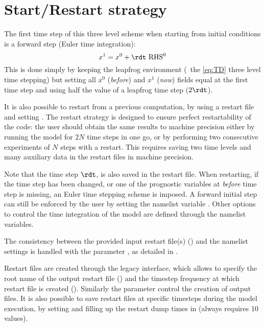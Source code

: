 \documentclass[../main/NEMO_manual]{subfiles}
\begin{document}
\section{Start/Restart strategy}
\label{sec:TD_rst}

\begin{listing}
  \caption{}
  \label{lst:namrun}
\end{listing}

The first time step of this three level scheme when starting from initial conditions is
a forward step (Euler time integration):
\[
  x^1 = x^0 + \rdt \ \text{RHS}^0
\]
This is done simply by keeping the leapfrog environment
(\ie\ the \autoref{eq:TD} three level time stepping) but
setting all $x^0$ (\textit{before}) and $x^1$ (\textit{now}) fields equal at the first time step and
using half the value of a leapfrog time step ($2 \rdt$).

It is also possible to restart from a previous computation, by using a restart file and setting .
The restart strategy is designed to ensure perfect restartability of the code:
the user should obtain the same results to machine precision either by
running the model for $2N$ time steps in one go,
or by performing two consecutive experiments of $N$ steps with a restart.
This requires saving two time levels and many auxiliary data in
the restart files in machine precision.

Note that the time step $\rdt$, is also saved in the restart file.
When restarting, if the time step has been changed, or
one of the prognostic variables at \textit{before} time step is missing,
an Euler time stepping scheme is imposed.
A forward initial step can still be enforced by the user by
setting the namelist variable .
Other options to control the time integration of the model are defined through
the  namelist variables.

The consistency between the provided input restart file(s) () and 
the namelist settings is handled with the parameter , as detailed in .

Restart files are created through the legacy interface, which allows to specify the root name
of the output restart file () and the timestep frequency at which restart file is created ().
Similarly the parameter  control the creation of output files.
It is also possible to save restart files at specific timesteps during the model execution, 
by setting  and filling up the restart dump times in  (always requires 10 values).
\end{document}
